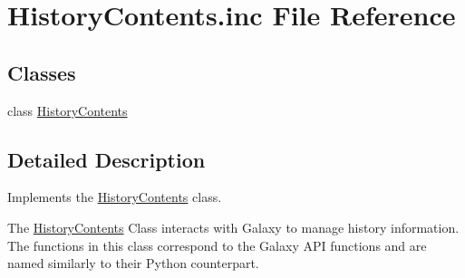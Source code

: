 \hypertarget{HistoryContents_8inc}{}\section{History\+Contents.\+inc File Reference}
\label{HistoryContents_8inc}
\subsection*{Classes}
\begin{DoxyCompactItemize}
\item 
class \hyperlink{classHistoryContents}{History\+Contents}
\end{DoxyCompactItemize}


\subsection{Detailed Description}
Implements the \hyperlink{classHistoryContents}{History\+Contents} class.

The \hyperlink{classHistoryContents}{History\+Contents} Class interacts with Galaxy to manage history information. The functions in this class correspond to the Galaxy A\+PI functions and are named similarly to their Python counterpart. 